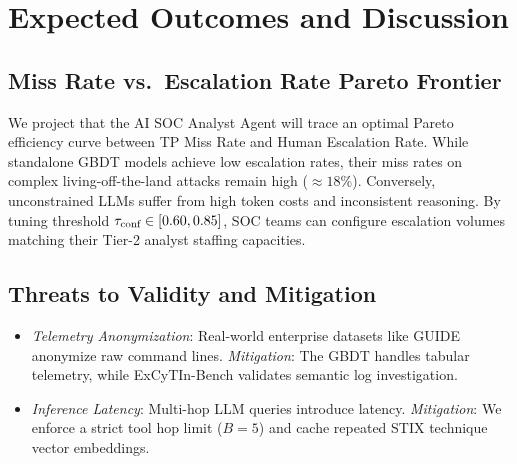 \section{Expected Outcomes and Discussion}

\subsection{Miss Rate vs.\ Escalation Rate Pareto Frontier}
We project that the AI SOC Analyst Agent will trace an optimal Pareto efficiency curve between TP Miss Rate and Human Escalation Rate. While standalone GBDT models achieve low escalation rates, their miss rates on complex living-off-the-land attacks remain high ($\approx 18\%$). Conversely, unconstrained LLMs suffer from high token costs and inconsistent reasoning. By tuning threshold $\tau_{\text{conf}} \in [0.60, 0.85]$, SOC teams can configure escalation volumes matching their Tier-2 analyst staffing capacities.

\subsection{Threats to Validity and Mitigation}
\begin{itemize}
    \item \textit{Telemetry Anonymization}: Real-world enterprise datasets like GUIDE anonymize raw command lines. \textit{Mitigation}: The GBDT handles tabular telemetry, while ExCyTIn-Bench validates semantic log investigation.
    \item \textit{Inference Latency}: Multi-hop LLM queries introduce latency. \textit{Mitigation}: We enforce a strict tool hop limit ($B=5$) and cache repeated STIX technique vector embeddings.
\end{itemize}
